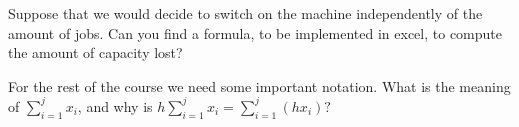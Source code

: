 \begin{exercise}
  Suppose that we would decide to switch on the machine independently
  of the amount of jobs. Can you find a formula, to be implemented in
  excel, to compute the amount of capacity lost?

\end{exercise}



\begin{exercise}
  For the rest of the course we need some important notation. What is the meaning of $\sum_{i=1}^j x_i$, and why is $h \sum_{i=1}^j x_i = \sum_{i=1}^j (hx_i)?$

\end{exercise}

